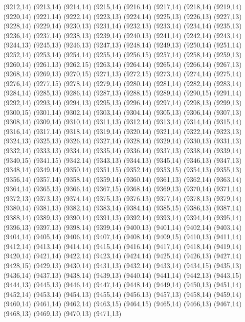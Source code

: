 (9212,14)
(9213,14)
(9214,14)
(9215,14)
(9216,14)
(9217,14)
(9218,14)
(9219,14)
(9220,14)
(9221,14)
(9222,14)
(9223,13)
(9224,14)
(9225,13)
(9226,13)
(9227,13)
(9228,14)
(9229,14)
(9230,13)
(9231,14)
(9232,13)
(9233,14)
(9234,14)
(9235,13)
(9236,14)
(9237,14)
(9238,13)
(9239,14)
(9240,13)
(9241,14)
(9242,14)
(9243,14)
(9244,13)
(9245,13)
(9246,13)
(9247,13)
(9248,14)
(9249,13)
(9250,14)
(9251,14)
(9252,14)
(9253,14)
(9254,14)
(9255,14)
(9256,15)
(9257,14)
(9258,14)
(9259,13)
(9260,14)
(9261,13)
(9262,15)
(9263,14)
(9264,14)
(9265,14)
(9266,14)
(9267,13)
(9268,14)
(9269,13)
(9270,15)
(9271,13)
(9272,15)
(9273,14)
(9274,14)
(9275,14)
(9276,14)
(9277,15)
(9278,14)
(9279,14)
(9280,14)
(9281,14)
(9282,14)
(9283,14)
(9284,14)
(9285,13)
(9286,14)
(9287,13)
(9288,15)
(9289,14)
(9290,15)
(9291,14)
(9292,14)
(9293,14)
(9294,13)
(9295,13)
(9296,14)
(9297,14)
(9298,13)
(9299,13)
(9300,15)
(9301,14)
(9302,14)
(9303,14)
(9304,14)
(9305,13)
(9306,14)
(9307,13)
(9308,14)
(9309,14)
(9310,14)
(9311,13)
(9312,14)
(9313,14)
(9314,14)
(9315,14)
(9316,14)
(9317,14)
(9318,14)
(9319,14)
(9320,14)
(9321,14)
(9322,14)
(9323,13)
(9324,13)
(9325,13)
(9326,14)
(9327,14)
(9328,14)
(9329,14)
(9330,13)
(9331,13)
(9332,14)
(9333,13)
(9334,14)
(9335,14)
(9336,14)
(9337,13)
(9338,14)
(9339,14)
(9340,15)
(9341,15)
(9342,14)
(9343,13)
(9344,13)
(9345,14)
(9346,13)
(9347,13)
(9348,14)
(9349,14)
(9350,14)
(9351,15)
(9352,14)
(9353,15)
(9354,13)
(9355,13)
(9356,14)
(9357,14)
(9358,14)
(9359,14)
(9360,14)
(9361,13)
(9362,14)
(9363,14)
(9364,14)
(9365,13)
(9366,14)
(9367,15)
(9368,14)
(9369,13)
(9370,14)
(9371,14)
(9372,13)
(9373,13)
(9374,14)
(9375,13)
(9376,13)
(9377,14)
(9378,13)
(9379,14)
(9380,14)
(9381,13)
(9382,14)
(9383,14)
(9384,14)
(9385,15)
(9386,13)
(9387,14)
(9388,14)
(9389,13)
(9390,14)
(9391,13)
(9392,14)
(9393,14)
(9394,14)
(9395,14)
(9396,13)
(9397,13)
(9398,14)
(9399,14)
(9400,13)
(9401,14)
(9402,14)
(9403,14)
(9404,14)
(9405,14)
(9406,14)
(9407,14)
(9408,14)
(9409,15)
(9410,13)
(9411,14)
(9412,14)
(9413,14)
(9414,14)
(9415,14)
(9416,14)
(9417,14)
(9418,14)
(9419,14)
(9420,14)
(9421,14)
(9422,14)
(9423,14)
(9424,14)
(9425,14)
(9426,13)
(9427,14)
(9428,15)
(9429,13)
(9430,14)
(9431,13)
(9432,14)
(9433,14)
(9434,15)
(9435,13)
(9436,14)
(9437,13)
(9438,14)
(9439,13)
(9440,14)
(9441,14)
(9442,13)
(9443,15)
(9444,13)
(9445,13)
(9446,14)
(9447,14)
(9448,14)
(9449,14)
(9450,13)
(9451,14)
(9452,14)
(9453,14)
(9454,13)
(9455,14)
(9456,13)
(9457,13)
(9458,14)
(9459,14)
(9460,14)
(9461,14)
(9462,14)
(9463,15)
(9464,15)
(9465,14)
(9466,13)
(9467,14)
(9468,13)
(9469,13)
(9470,13)
(9471,13)

